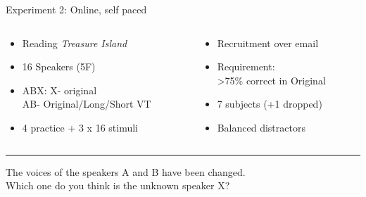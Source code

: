 \documentclass[xcolor={dvipsnames}]{beamer}
\begin{document}
\begin{frame}{Experiment 2: Online, self paced}
\begin{columns}
\begin{column}{0.48\textwidth}
\begin{itemize}
    \item Reading \textit{Treasure Island}
    \item 16 Speakers (5F)
    \item ABX: X- original\\AB- Original/Long/Short VT
    \item 4 practice + 3 x 16 stimuli
\end{itemize}
\end{column}
\begin{column}{0.48\textwidth}
\begin{itemize}
    \item Recruitment over email
    \item Requirement: \\>75\% correct in Original
    \item 7 subjects (+1 dropped)
    \item Balanced distractors
\end{itemize}
\end{column}
\end{columns}
\vskip 0.5cm
\hrule
\vskip 0.2cm
The voices of the speakers A and B have been changed. \\
Which one do you think is the unknown speaker X?
\vskip 0.2cm


\end{frame}
\end{document}
